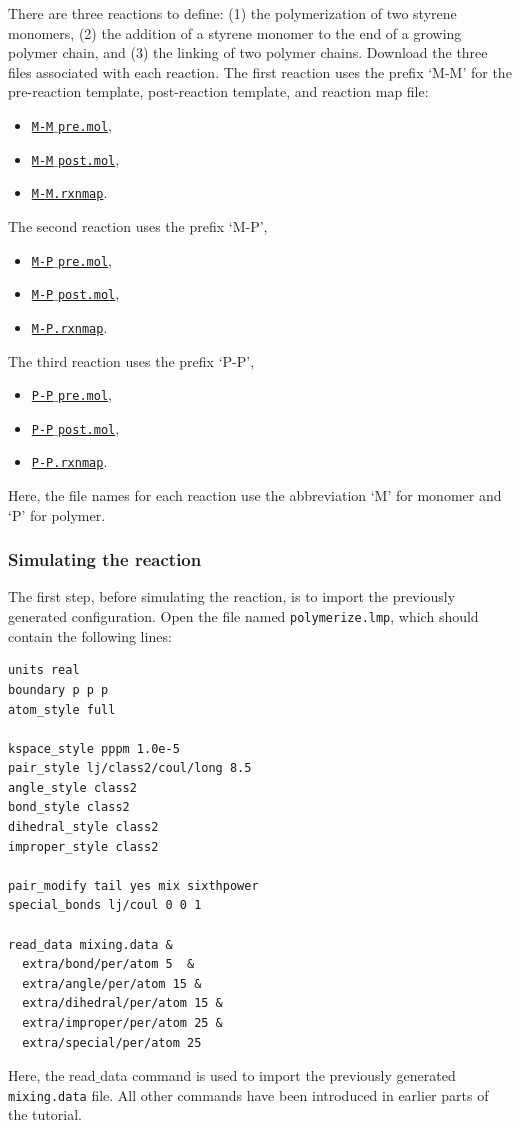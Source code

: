 \documentclass[9pt,tutorial]{livecoms}
\newcommand{\lmpcmd}[1]{\hspace{0pt}\colorbox{listing}{\textcolor{command}{\small{#1}}}\hspace{0pt}} %
\newcommand{\flecmd}[1]{\textcolor{command}{\texttt{#1}}} %
\newcommand{\dwlcmd}[1]{\textcolor{download}{\texttt{#1}}} %
\newcommand{\filepath}{https://raw.githubusercontent.com/lammpstutorials/lammpstutorials-article/main/files/}
\begin{document}
There are three reactions to define: (1) the polymerization of two styrene monomers,
(2) the addition of a styrene monomer to the end of a growing polymer chain, and (3) the
linking of two polymer chains.  Download the three files associated with each reaction.
The first reaction uses the prefix `M-M' for the pre-reaction template,
post-reaction template, and reaction map file:
\begin{itemize}
\item \href{\filepath tutorial8/M-M_pre.mol}{\dwlcmd{M-M$\_$pre.mol}},
\item \href{\filepath tutorial8/M-M_post.mol}{\dwlcmd{M-M$\_$post.mol}},
\item \href{\filepath tutorial8/M-M.rxnmap}{\dwlcmd{M-M.rxnmap}}.
\end{itemize}
The second reaction uses the prefix `M-P',
\begin{itemize}
\item \href{\filepath tutorial8/M-P_pre.lmpmol}{\dwlcmd{M-P$\_$pre.mol}},
\item \href{\filepath tutorial8/M-P_post.lmpmol}{\dwlcmd{M-P$\_$post.mol}},
\item \href{\filepath tutorial8/M-P.rxnmap}{\dwlcmd{M-P.rxnmap}}.
\end{itemize}
The third reaction uses the prefix `P-P',
\begin{itemize}
\item \href{\filepath tutorial8/P-P_pre.lmpmol}{\dwlcmd{P-P$\_$pre.mol}},
\item \href{\filepath tutorial8/P-P_post.lmpmol}{\dwlcmd{P-P$\_$post.mol}},
\item \href{\filepath tutorial8/P-P.rxnmap}{\dwlcmd{P-P.rxnmap}}.
\end{itemize}
Here, the file names for each reaction use the abbreviation `M' for monomer and `P'
for polymer.

\subsubsection{Simulating the reaction}

The first step, before simulating the reaction, is to import the previously
generated configuration.  Open the file named \flecmd{polymerize.lmp},
which should contain the following lines:
\begin{lstlisting}
units real
boundary p p p
atom_style full

kspace_style pppm 1.0e-5
pair_style lj/class2/coul/long 8.5
angle_style class2
bond_style class2
dihedral_style class2
improper_style class2

pair_modify tail yes mix sixthpower
special_bonds lj/coul 0 0 1

read_data mixing.data &
  extra/bond/per/atom 5  &
  extra/angle/per/atom 15 &
  extra/dihedral/per/atom 15 &
  extra/improper/per/atom 25 &
  extra/special/per/atom 25
\end{lstlisting}
Here, the \lmpcmd{read$\_$data} command is used to import the
previously generated \flecmd{mixing.data} file.  All other commands
have been introduced in earlier parts of the tutorial.
\end{document}
